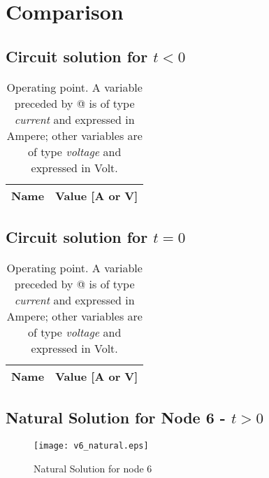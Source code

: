 \section{Comparison}
\subsection{Circuit solution for $t<0$}






\begin{table}[h]
  \centering
  \begin{tabular}{|l|r|}
    \hline
    {\bf Name} & {\bf Value [A or V]} \\ \hline
    
  \end{tabular}
  \caption{Operating point. A variable preceded by @ is of type {\em current}
    and expressed in Ampere; other variables are of type {\it voltage} and expressed in
    Volt.}
  \label{tab:op}
\end{table}


\newpage

\subsection{Circuit solution for $t=0$}



\newpage
\begin{table}[h]
  \centering
  \begin{tabular}{|l|r|}
    \hline
    {\bf Name} & {\bf Value [A or V]} \\ \hline
    
  \end{tabular}
  \caption{Operating point. A variable preceded by @ is of type {\em current}
    and expressed in Ampere; other variables are of type {\it voltage} and expressed in Volt.}
  \label{tab:op2}
\end{table}

\newpage
\subsection{Natural Solution for Node 6 - $t>0$}

\begin{figure}[h] \centering
\texttt{[image: v6\_natural.eps]}
\caption{Natural Solution for node 6}
\label{fig:forced}
\end{figure}



